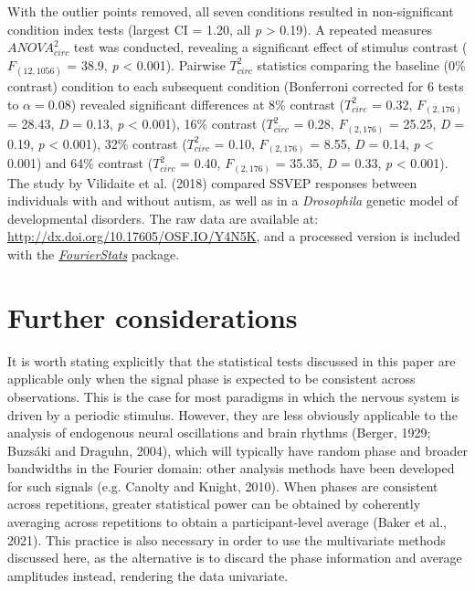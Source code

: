 \documentclass[]{article}
\begin{document}
With the outlier points removed, all seven conditions resulted in non-significant condition index tests (largest CI = 1.20, all \emph{p} \textgreater{} 0.19). A repeated measures \(ANOVA^2_{circ}\) test was conducted, revealing a significant effect of stimulus contrast (\(F_{(12,1056)}\) = 38.9, \emph{p} \textless{} 0.001). Pairwise \(T^2_{circ}\) statistics comparing the baseline (0\% contrast) condition to each subsequent condition (Bonferroni corrected for 6 tests to \(\alpha = 0.08\)) revealed significant differences at 8\% contrast (\(T^2_{circ}\) = 0.32, \(F_{(2,176)}\) = 28.43, \emph{D} = 0.13, \emph{p} \textless{} 0.001), 16\% contrast (\(T^2_{circ}\) = 0.28, \(F_{(2,176)}\) = 25.25, \emph{D} = 0.19, \emph{p} \textless{} 0.001), 32\% contrast (\(T^2_{circ}\) = 0.10, \(F_{(2,176)}\) = 8.55, \emph{D} = 0.14, \emph{p} \textless{} 0.001) and 64\% contrast (\(T^2_{circ}\) = 0.40, \(F_{(2,176)}\) = 35.35, \emph{D} = 0.33, \emph{p} \textless{} 0.001). The study by Vilidaite et al. (2018) compared SSVEP responses between individuals with and without autism, as well as in a \emph{Drosophila} genetic model of developmental disorders. The raw data are available at: \url{http://dx.doi.org/10.17605/OSF.IO/Y4N5K}, and a processed version is included with the \href{https://github.com/bakerdh/FourierStats}{\emph{FourierStats}} package.

\hypertarget{further-considerations}{%
\section{Further considerations}\label{further-considerations}}

It is worth stating explicitly that the statistical tests discussed in this paper are applicable only when the signal phase is expected to be consistent across observations. This is the case for most paradigms in which the nervous system is driven by a periodic stimulus. However, they are less obviously applicable to the analysis of endogenous neural oscillations and brain rhythms (Berger, 1929; Buzsáki and Draguhn, 2004), which will typically have random phase and broader bandwidths in the Fourier domain: other analysis methods have been developed for such signals (e.g. Canolty and Knight, 2010). When phases are consistent across repetitions, greater statistical power can be obtained by coherently averaging across repetitions to obtain a participant-level average (Baker et al., 2021). This practice is also necessary in order to use the multivariate methods discussed here, as the alternative is to discard the phase information and average amplitudes instead, rendering the data univariate.
\end{document}
